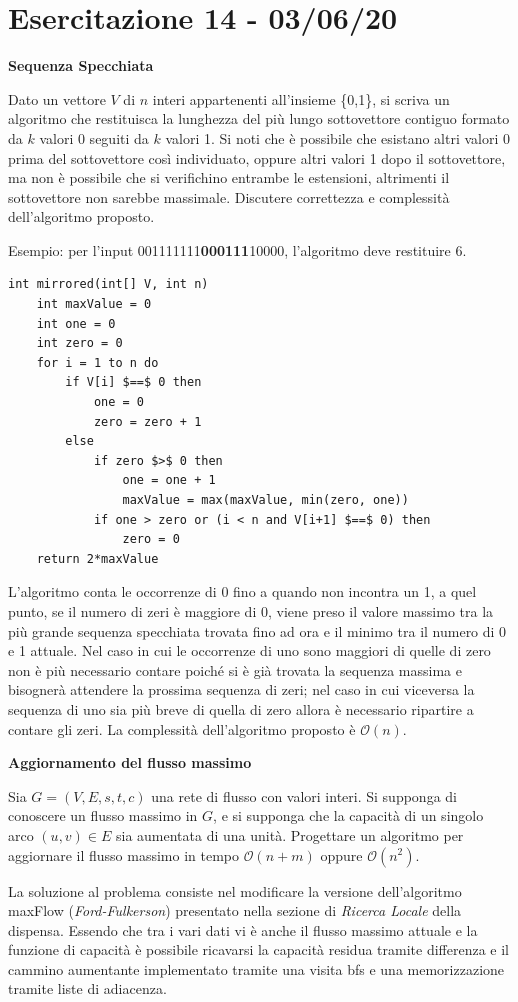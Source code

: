 \documentclass[../cheatSheetAlgoritmi.tex]{subfiles}
\begin{document}
\section{Esercitazione 14 - 03/06/20}
\textbf{Sequenza Specchiata}

Dato un vettore $V$ di $n$ interi appartenenti all'insieme \{0,1\}, si scriva un algoritmo che restituisca la lunghezza del più lungo sottovettore contiguo formato da $k$ valori 0 seguiti da $k$ valori 1. Si noti che è possibile che esistano altri valori 0 prima del sottovettore così individuato, oppure altri valori 1 dopo il sottovettore, ma non è possibile che si verifichino entrambe le estensioni, altrimenti il sottovettore non sarebbe massimale. Discutere correttezza e complessità dell'algoritmo proposto.

Esempio: per l’input 001111111\textbf{000111}10000, l'algoritmo deve restituire 6.

\begin{lstlisting}[caption=Sequenza Specchiata]
int mirrored(int[] V, int n)
	int maxValue = 0
	int one = 0
	int zero = 0
	for i = 1 to n do
		if V[i] $==$ 0 then
			one = 0
			zero = zero + 1
		else
			if zero $>$ 0 then
				one = one + 1
				maxValue = max(maxValue, min(zero, one))
			if one > zero or (i < n and V[i+1] $==$ 0) then
				zero = 0
	return 2*maxValue
\end{lstlisting}
L'algoritmo conta le occorrenze di 0 fino a quando non incontra un 1, a quel punto, se il numero di zeri è maggiore di 0, viene preso il valore massimo tra la più grande sequenza specchiata trovata fino ad ora e il minimo tra il numero di 0 e 1 attuale. Nel caso in cui le occorrenze di uno sono maggiori di quelle di zero non è più necessario contare poiché si è già trovata la sequenza massima e bisognerà attendere la prossima sequenza di zeri; nel caso in cui viceversa la sequenza di uno sia più breve di quella di zero allora è necessario ripartire a contare gli zeri. La complessità dell'algoritmo proposto è $\mathcal{O}(n)$.

\bigskip

\textbf{Aggiornamento del flusso massimo}

Sia $G= (V, E, s, t, c)$ una rete di flusso con valori interi. Si supponga di conoscere un flusso massimo in $G$, e si supponga che la capacità di un singolo arco $(u, v) \in E$ sia aumentata di una unità. Progettare un algoritmo per aggiornare il flusso massimo in tempo $\mathcal{O}(n+m)$ oppure $\mathcal{O}(n^{2})$.

La soluzione al problema consiste nel modificare la versione dell'algoritmo maxFlow \hfill \break (\emph{Ford-Fulkerson}) presentato nella sezione di \emph{Ricerca Locale} della dispensa. Essendo che tra i vari dati vi è anche il flusso massimo attuale e la funzione di capacità è possibile ricavarsi la capacità residua tramite differenza e il cammino aumentante implementato tramite una visita bfs e una memorizzazione tramite liste di adiacenza.
 
\end{document}
